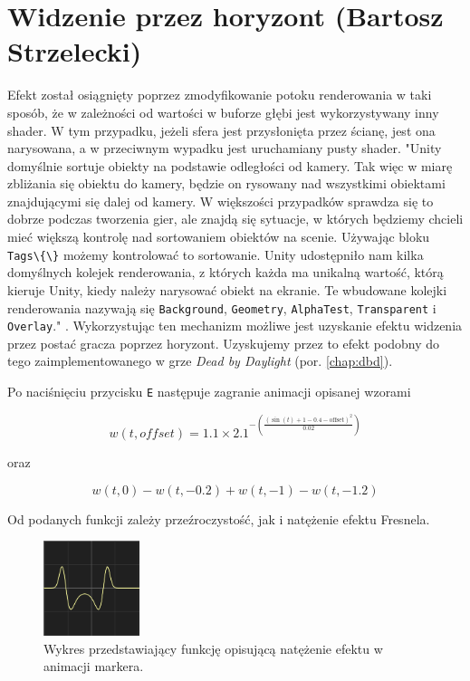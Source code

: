\section{Widzenie przez horyzont (Bartosz Strzelecki)}\label{s:wid_impl}
Efekt został osiągnięty poprzez zmodyfikowanie potoku renderowania w taki sposób, że w zależności od wartości w buforze głębi jest wykorzystywany inny shader.
W tym przypadku, jeżeli sfera jest przysłonięta przez ścianę, jest ona narysowana, a w przeciwnym wypadku jest uruchamiany pusty shader.
"Unity domyślnie sortuje obiekty na podstawie odległości od kamery. Tak więc
w miarę zbliżania się obiektu do kamery, będzie on rysowany nad wszystkimi obiektami znajdującymi się dalej od kamery.
W większości przypadków sprawdza się to dobrze podczas tworzenia gier, ale
znajdą się sytuacje, w których będziemy chcieli mieć większą kontrolę nad sortowaniem obiektów na scenie. Używając bloku \verb|Tags\{\}| możemy kontrolować to sortowanie.
Unity udostępniło nam kilka domyślnych kolejek renderowania, z których każda ma unikalną wartość, którą
kieruje Unity, kiedy należy narysować obiekt na ekranie. Te wbudowane kolejki renderowania
nazywają się \verb|Background|, \verb|Geometry|, \verb|AlphaTest|, \verb|Transparent| i \verb|Overlay|." \cite{shaderscookbook}. Wykorzystując ten mechanizm
możliwe jest uzyskanie efektu widzenia przez postać gracza poprzez horyzont. Uzyskujemy przez to efekt podobny do tego zaimplementowanego w grze \textit{Dead by Daylight} (por. \ref{chap:dbd}).

Po naciśnięciu przycisku \texttt{E} następuje zagranie animacji opisanej wzorami

\begin{equation}
w(t, offset) = 1.1 \times 2.1^{-\left(\frac{{\left(\sin(t) + 1 - 0.4 - \text{{offset}}\right)^2}}{{0.02}}\right)}
\end{equation}

oraz

\begin{equation}
w(t, 0) - w(t, -0.2) + w(t, -1) - w(t, -1.2)
\end{equation}

Od podanych funkcji zależy przeźroczystość, jak i natężenie efektu Fresnela. 

\begin{figure}[h]
    \centering
    \includegraphics[width=0.25\textwidth]{images/g}
    \caption{Wykres przedstawiający funkcję opisującą natężenie efektu w animacji markera.}
\end{figure}



